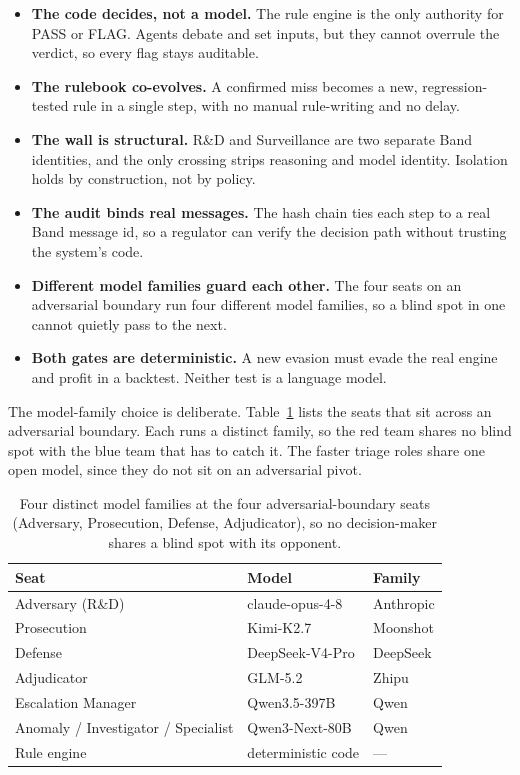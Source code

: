 \documentclass[11pt,a4paper]{article}
\begin{document}
\begin{itemize}[leftmargin=1.2em,itemsep=2pt,topsep=2pt]
\item \textbf{The code decides, not a model.} The rule engine is the only authority for PASS or FLAG. Agents debate and set inputs, but they cannot overrule the verdict, so every flag stays auditable.
\item \textbf{The rulebook co-evolves.} A confirmed miss becomes a new, regression-tested rule in a single step, with no manual rule-writing and no delay.
\item \textbf{The wall is structural.} R\&D and Surveillance are two separate Band identities, and the only crossing strips reasoning and model identity. Isolation holds by construction, not by policy.
\item \textbf{The audit binds real messages.} The hash chain ties each step to a real Band message id, so a regulator can verify the decision path without trusting the system's code.
\item \textbf{Different model families guard each other.} The four seats on an adversarial boundary run four different model families, so a blind spot in one cannot quietly pass to the next.
\item \textbf{Both gates are deterministic.} A new evasion must evade the real engine and profit in a backtest. Neither test is a language model.
\end{itemize}

The model-family choice is deliberate. Table~\ref{tab:models} lists the seats that sit across an adversarial boundary. Each runs a distinct family, so the red team shares no blind spot with the blue team that has to catch it. The faster triage roles share one open model, since they do not sit on an adversarial pivot.

\begin{table}[H]\centering\small
\begin{tabular}{@{}lll@{}}
\toprule
\textbf{Seat} & \textbf{Model} & \textbf{Family} \\
\midrule
Adversary (R\&D) & claude-opus-4-8 & Anthropic \\
Prosecution & Kimi-K2.7 & Moonshot \\
Defense & DeepSeek-V4-Pro & DeepSeek \\
Adjudicator & GLM-5.2 & Zhipu \\
Escalation Manager & Qwen3.5-397B & Qwen \\
Anomaly / Investigator / Specialist & Qwen3-Next-80B & Qwen \\
Rule engine & deterministic code & --- \\
\bottomrule
\end{tabular}
\caption{Four distinct model families at the four adversarial-boundary seats (Adversary, Prosecution, Defense, Adjudicator), so no decision-maker shares a blind spot with its opponent.}
\label{tab:models}
\end{table}
\end{document}
